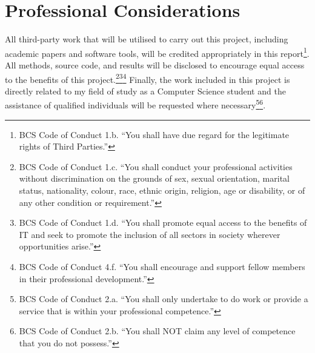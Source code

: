 \chapter{Professional Considerations}
All third-party work that will be utilised to carry out this project, including academic papers and software tools, will be credited appropriately in this report\footnote{BCS Code of Conduct 1.b. “You shall have due regard for the legitimate rights of Third Parties.”}. All methods, source code, and results will be disclosed to encourage equal access to the benefits of this project.\footnote{BCS Code of Conduct 1.c. “You shall conduct your professional activities without discrimination on the grounds of sex, sexual orientation, marital status, nationality, colour, race, ethnic origin, religion, age or disability, or of any other condition or requirement.”}\footnote{BCS Code of Conduct 1.d. “You shall promote equal access to the benefits of IT and seek to promote the inclusion of all sectors in society wherever opportunities arise.”}\footnote{BCS Code of Conduct 4.f. “You shall encourage and support fellow members in their professional development.”} Finally, the work included in this project is directly related to my field of study as a Computer Science student and the assistance of qualified individuals will be requested where necessary\footnote{BCS Code of Conduct 2.a. “You shall only undertake to do work or provide a service that is within your professional competence.”}\footnote{BCS Code of Conduct 2.b. “You shall NOT claim any level of competence that you do not possess.”}.
